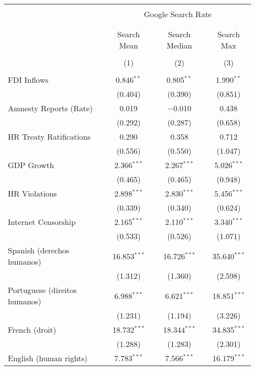 
\begin{table}[!htbp] \centering 
  \caption{} 
  \label{} 
\begin{tabular}{@{\extracolsep{5pt}}lccc} 
\\[-1.8ex]\hline 
\hline \\[-1.8ex] 
 & \multicolumn{3}{c}{Google Search Rate} \\ 
\cline{2-4} 
\\[-1.8ex] & \multicolumn{3}{c}{ } \\ 
 & Search Mean & Search Median & Search Max \\ 
\\[-1.8ex] & (1) & (2) & (3)\\ 
\hline \\[-1.8ex] 
 FDI Inflows & 0.846$^{**}$ & 0.805$^{**}$ & 1.990$^{**}$ \\ 
  & (0.404) & (0.390) & (0.851) \\ 
  Amnesty Reports (Rate) & 0.019 & $-$0.010 & 0.438 \\ 
  & (0.292) & (0.287) & (0.658) \\ 
  HR Treaty Ratifications & 0.290 & 0.358 & 0.712 \\ 
  & (0.556) & (0.550) & (1.047) \\ 
  GDP Growth & 2.366$^{***}$ & 2.267$^{***}$ & 5.026$^{***}$ \\ 
  & (0.465) & (0.465) & (0.948) \\ 
  HR Violations & 2.898$^{***}$ & 2.830$^{***}$ & 5.456$^{***}$ \\ 
  & (0.339) & (0.340) & (0.624) \\ 
  Internet Censorship & 2.165$^{***}$ & 2.110$^{***}$ & 3.340$^{***}$ \\ 
  & (0.533) & (0.526) & (1.071) \\ 
  Spanish (derechos humanos) & 16.853$^{***}$ & 16.726$^{***}$ & 35.640$^{***}$ \\ 
  & (1.312) & (1.360) & (2.598) \\ 
  Portuguese (direitos humanos) & 6.988$^{***}$ & 6.621$^{***}$ & 18.851$^{***}$ \\ 
  & (1.231) & (1.194) & (3.226) \\ 
  French (droit) & 18.732$^{***}$ & 18.344$^{***}$ & 34.835$^{***}$ \\ 
  & (1.288) & (1.283) & (2.301) \\ 
  English (human rights) & 7.783$^{***}$ & 7.566$^{***}$ & 16.179$^{***}$ \\ 

\end{tabular}
\end{table}
